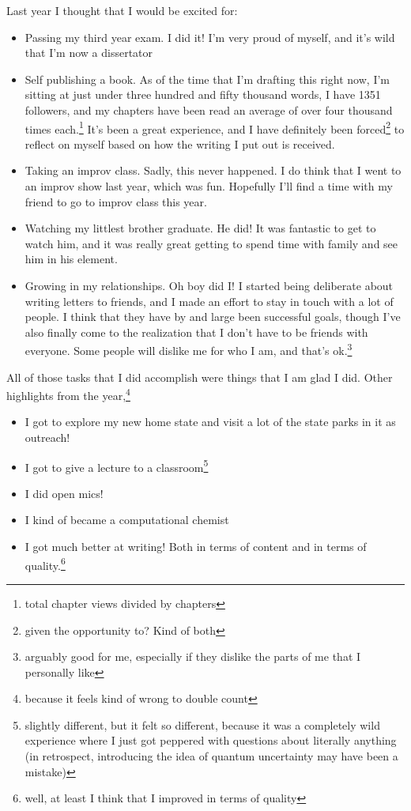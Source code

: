 \documentclass[12pt]{article}[titlepage]
\renewcommand{\,}{\textsuperscript{,}}
\begin{document}
Last year I thought that I would be excited for:
\begin{itemize}
\item Passing my third year exam. I did it! I'm very proud of myself, and it's wild that I'm now a dissertator
\item Self publishing a book. As of the time that I'm drafting this right now, I'm sitting at just under three hundred and fifty thousand words, I have 1351 followers, and my chapters have been read an average of over four thousand times each.\footnote{total chapter views divided by chapters} It's been a great experience, and I have definitely been forced\footnote{given the opportunity to? Kind of both} to reflect on myself based on how the writing I put out is received.
\item Taking an improv class. Sadly, this never happened. I do think that I went to an improv show last year, which was fun. Hopefully I'll find a time with my friend to go to improv class this year.
\item Watching my littlest brother graduate. He did! It was fantastic to get to watch him, and it was really great getting to spend time with family and see him in his element.
\item Growing in my relationships. Oh boy did I! I started being deliberate about writing letters to friends, and I made an effort to stay in touch with a lot of people. I think that they have by and large been successful goals, though I've also finally come to the realization that I don't have to be friends with everyone. Some people will dislike me for who I am, and that's ok.\footnote{arguably good for me, especially if they dislike the parts of me that I personally like}
\end{itemize}

All of those tasks that I did accomplish were things that I am glad I did.
Other highlights from the year,\footnote{because it feels kind of wrong to double count}

\begin{itemize}
\item I got to explore my new home state and visit a lot of the state parks in it as outreach!
\item I got to give a lecture to a classroom\footnote{slightly different, but it felt so different, because it was a completely wild experience where I just got peppered with questions about literally anything (in retrospect, introducing the idea of quantum uncertainty may have been a mistake)}
\item I did open mics!
\item I kind of became a computational chemist
\item I got much better at writing! Both in terms of content and in terms of quality.\footnote{well, at least I think that I improved in terms of quality}
\end{itemize}
\end{document}
